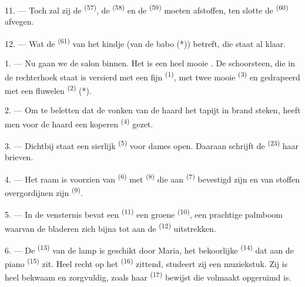 

11. --- Toch zal zij de  \textsuperscript{(57)}, de
 \textsuperscript{(58)} en de 
\textsuperscript{(59)} moeten afstoffen, ten slotte de  \textsuperscript{(60)}
afvegen.

12. --- Wat de  \textsuperscript{(61)} van het kindje (van de babo (*)) betreft,
die staat al klaar.

\VUsaut{5.0mm}
\VUsaut{3.0mm}

1. --- Nu gaan we de salon binnen. Het is een heel mooie . De schoorsteen, die
in de rechterhoek staat is versierd met een fijn
 \textsuperscript{(1)}, met twee mooie 
\textsuperscript{(3)} en gedrapeerd met een fluwelen 
\textsuperscript{(2)} (*).

2. --- Om te beletten dat de vonken van de haard het tapijt in brand steken, heeft men voor de
haard een koperen  \textsuperscript{(4)} gezet.

3. --- Dichtbij staat een sierlijk  \textsuperscript{(5)} voor dames
open. Daaraan schrijft de  \textsuperscript{(23)} haar brieven.

4. --- Het raam is voorzien van  \textsuperscript{(6)} met
 \textsuperscript{(8)} die aan 
\textsuperscript{(7)} bevestigd zijn en van stoffen overgordijnen
 zijn \textsuperscript{(9)}.

5. --- In de vensternis bevat een  \textsuperscript{(11)} een groene
 \textsuperscript{(10)}, een prachtige palmboom waarvan de bladeren zich bijna
tot aan de  \textsuperscript{(12)} uitstrekken.

6. --- De  \textsuperscript{(13)} van de lamp is geschikt door Maria, het
bekoorlijke  \textsuperscript{(14)} dat aan de piano \textsuperscript{(15)}
zit. Heel recht op het  \textsuperscript{(16)} zittend, studeert zij een
muziekstuk. Zij is heel bekwaam en zorgvuldig, zoals haar 
\textsuperscript{(17)} bewijst die volmaakt opgeruimd is.

